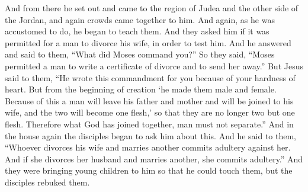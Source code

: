 \begin{biblechapter} %
 And from there he set out and came to the region of Judea and the other side of the Jordan, and again crowds came together to him. And again, as he was accustomed to do, he began to teach them.
\verse And they asked him if it was permitted for a man to divorce his wife, in order to test him.
\verse And he answered and said to them, “What did Moses command you?”
\verse So they said, “Moses permitted a man to write a certificate of divorce and to send her away.”
\verse But Jesus said to them, “He wrote this commandment for you because of your hardness of heart.
\verse But from the beginning of creation ‘he made them male and female.
\verse Because of this a man will leave his father and mother and will be joined to his wife,
\verse and the two will become one flesh,’ so that they are no longer two but one flesh.
\verse Therefore what God has joined together, man must not separate.”
\verse And in the house again the disciples began to ask him about this.
\verse And he said to them, “Whoever divorces his wife and marries another commits adultery against her.
\verse And if she divorces her husband and marries another, she commits adultery.”
 And they were bringing young children to him so that he could touch them, but the disciples rebuked them.

\end{biblechapter}
